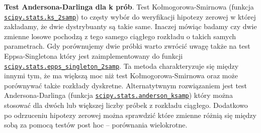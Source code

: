 \documentclass[polish,]{book}
\begin{document}
\textbf{Test Andersona-Darlinga dla k prób}. Test Kołmogorowa-Smirnowa (funkcja \href{https://docs.scipy.org/doc/scipy/reference/generated/scipy.stats.ks_2samp.html\#scipy.stats.ks_2samp}{\texttt{scipy.stats.ks\_2samp}}) to częsty wybór do weryfikacji hipotezy zerowej w której zakładamy, że dwie dystrybuanty są takie same.
Inaczej mówiąc badamy czy dwie zmienne losowe pochodzą z tego samego ciągłego rozkładu o takich samych parametrach. Gdy porównujemy dwie próbki warto zwrócić uwagę także na test Eppsa-Singletona który jest zaimplementowany do funkcji \href{https://docs.scipy.org/doc/scipy/reference/generated/scipy.stats.epps_singleton_2samp.html}{\texttt{scipy.stats.epps\_singleton\_2samp}}. Ta metoda charakteryzuje się między innymi tym, że ma większą moc niż test Kołmogorowa-Smirnowa oraz może porównywać także rozkłady dyskretne.
Alternatytwnym rozwiązaniem jest test Andersona-Darlinga (funkcja \href{https://docs.scipy.org/doc/scipy/reference/generated/scipy.stats.anderson_ksamp.html\#scipy.stats.anderson_ksamp}{\texttt{scipy.stats.anderson\_ksamp}}) który można stosować dla dwóch lub większej liczby próbek z rozkładu ciągłego. Dodatkowo po odrzuceniu hipotezy zerowej można sprawdzić które zmienne różnią się między sobą za pomocą testów post hoc -- porównania wielokrotne.
\end{document}
